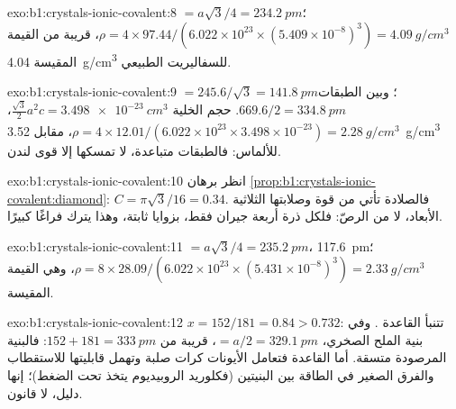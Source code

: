 \begin{solution}{exo:b1:crystals-ionic-covalent:8}
 $= a\sqrt3/4 = \qty{234.2}{pm}$؛
$\rho = 4 \times 97.44/(6.022 \times 10^{23} \times (5.409 \times
10^{-8})^3) = \qty{4.09}{g/cm^3}$، قريبة من القيمة المقيسة
\qty{4.04}{g/cm^3} للسفاليريت الطبيعي.
\end{solution}

\begin{solution}{exo:b1:crystals-ionic-covalent:9}
 $= 245.6/\sqrt3 = \qty{141.8}{pm}$؛ وبين الطبقات $669.6/2 =
\qty{334.8}{pm}$. حجم الخلية $\frac{\sqrt3}{2}a^2c = \qty{3.498e-23}{cm^3}$،
$\rho = 4 \times 12.01/(6.022 \times 10^{23} \times 3.498 \times 10^{-23})
= \qty{2.28}{g/cm^3}$، مقابل \qty{3.52}{g/cm^3} للألماس: فالطبقات
متباعدة، لا تمسكها إلا قوى لندن.
\end{solution}

\begin{solution}{exo:b1:crystals-ionic-covalent:10}
انظر برهان \cref{prop:b1:crystals-ionic-covalent:diamond}:
$C = \pi\sqrt3/16 = 0.34$. فالصلادة تأتي من قوة 
وصلابتها الثلاثية الأبعاد، لا من الرصّ: فلكل
ذرة أربعة جيران فقط، بزوايا ثابتة، وهذا يترك فراغًا
كبيرًا.
\end{solution}

\begin{solution}{exo:b1:crystals-ionic-covalent:11}
 $= a\sqrt3/4 = \qty{235.2}{pm}$، 
\qty{117.6}{pm}؛ $\rho = 8 \times 28.09/(6.022 \times 10^{23} \times
(5.431 \times 10^{-8})^3) = \qty{2.33}{g/cm^3}$، وهي القيمة المقيسة.
\end{solution}

\begin{solution}{exo:b1:crystals-ionic-covalent:12}
$x = 152/181 = 0.84 > 0.732$: تتنبأ القاعدة .
وفي بنية الملح الصخري،  $= a/2 = \qty{329.1}{pm}$، قريبة من
$152 + 181 = \qty{333}{pm}$: فالبنية المرصودة متسقة. أما
القاعدة فتعامل الأيونات كرات صلبة وتهمل قابليتها للاستقطاب
والفرق الصغير في الطاقة بين البنيتين (فكلوريد الروبيديوم
يتخذ  تحت الضغط)؛ إنها دليل،
لا قانون.
\end{solution}

